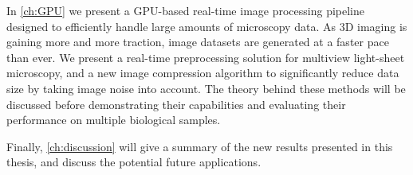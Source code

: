 In \autoref{ch:GPU} we present a GPU-based real-time image processing pipeline designed to efficiently handle large amounts of microscopy data. As 3D imaging is gaining more and more traction, image datasets are generated at a faster pace than ever. We present a real-time preprocessing solution for multiview light-sheet microscopy, and a new image compression algorithm to significantly reduce data size by taking image noise into account. The theory behind these methods will be discussed before demonstrating their capabilities and evaluating their performance on multiple biological samples.

Finally, \autoref{ch:discussion} will give a summary of the new results presented in this thesis, and discuss the potential future applications.